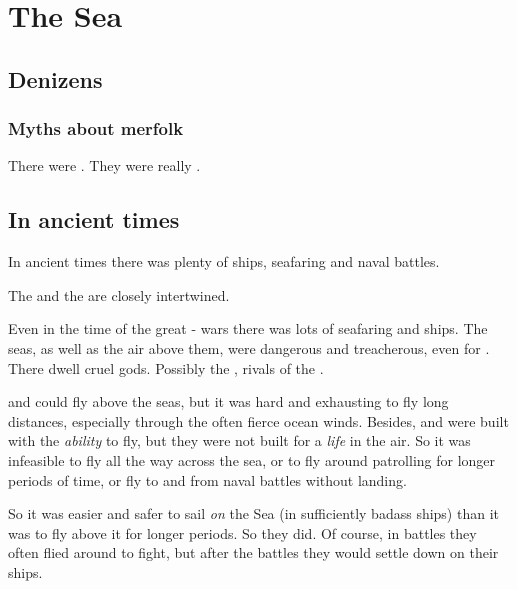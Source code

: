 \section{The Sea}









\subsection{Denizens}





\subsubsection{Myths about merfolk}
There were .
They were really \nagae.









\subsection{In ancient times}
In ancient times there was plenty of ships, seafaring and naval battles. 

The  and the  are closely intertwined.

Even in the time of the great \dragon-\resphan{} wars there was lots of seafaring and ships. 
The seas, as well as the air above them, were dangerous and treacherous, even for \dragons. 
There dwell cruel gods. 
Possibly the , rivals of the .

\Dragons{} and \resphain{} could fly above the seas, but it was hard and exhausting to fly long distances, especially through the often fierce ocean winds. 
Besides, \dragons{} and \resphain{} were built with the \emph{ability} to fly, but they were not built for a \emph{life} in the air. 
So it was infeasible to fly all the way across the sea, or to fly around patrolling for longer periods of time, or fly to and from naval battles without landing. 

So it was easier and safer to sail \emph{on} the Sea (in sufficiently badass ships) than it was to fly above it for longer periods. 
So they did. 
Of course, in battles they often flied around to fight, but after the battles they would settle down on their ships. 


